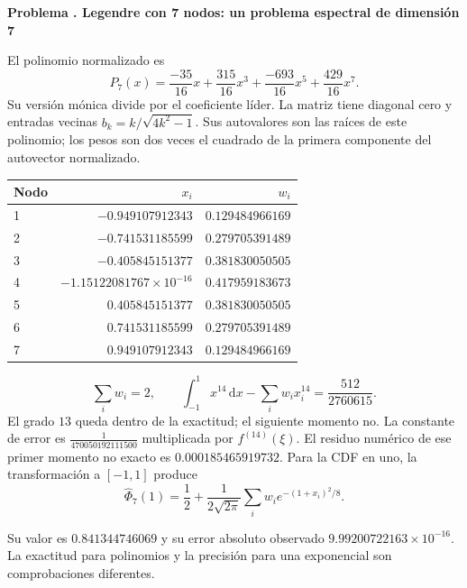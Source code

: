 \documentclass[11pt,a4paper]{article}
\newcommand{\dd}{\,\mathrm d}
\theoremstyle{definition}
\newcounter{problema}
\newenvironment{resuelto}[1]{\refstepcounter{problema}\par\medskip\Needspace{6\baselineskip}\textbf{Problema \theproblema. #1}\par}{\par\medskip}
\begin{document}
\begin{resuelto}{Legendre con 7 nodos: un problema espectral de dimensión 7}
El polinomio normalizado es
\[
P_{7}(x)=\frac{-35}{16}x+\frac{315}{16}x^{3}+\frac{-693}{16}x^{5}+\frac{429}{16}x^{7}.
\]
Su versión mónica divide por el coeficiente líder. La matriz tiene diagonal cero y entradas vecinas $b_k=k/\sqrt{4k^2-1}$. Sus autovalores son las raíces de este polinomio; los pesos son dos veces el cuadrado de la primera componente del autovector normalizado.

\begin{center}\small\begin{tabular}{lrr}
\toprule
Nodo & $x_i$ & $w_i$\\\midrule
1 & $-0.949107912343$ & $0.129484966169$\\
2 & $-0.741531185599$ & $0.279705391489$\\
3 & $-0.405845151377$ & $0.381830050505$\\
4 & $-1.15122081767\times10^{-16}$ & $0.417959183673$\\
5 & $0.405845151377$ & $0.381830050505$\\
6 & $0.741531185599$ & $0.279705391489$\\
7 & $0.949107912343$ & $0.129484966169$\\
\bottomrule\end{tabular}\end{center}

\[
\sum_iw_i=2,\qquad
\int_{-1}^1x^{14}\dd x-\sum_iw_ix_i^{14}
=\frac{512}{2760615}.
\]
El grado $13$ queda dentro de la exactitud; el siguiente momento no. La constante de error es $\frac{1}{470050192111500}$ multiplicada por $f^{(14)}(\xi)$. El residuo numérico de ese primer momento no exacto es $0.000185465919732$.
Para la CDF en uno, la transformación a $[-1,1]$ produce
\[
\widehat\Phi_{7}(1)=\frac12+
\frac1{2\sqrt{2\pi}}\sum_iw_i e^{-(1+x_i)^2/8}.
\]

Su valor es $0.841344746069$ y su error absoluto observado $9.99200722163\times10^{-16}$. La exactitud para polinomios y la precisión para una exponencial son comprobaciones diferentes.\end{resuelto}
\end{document}
